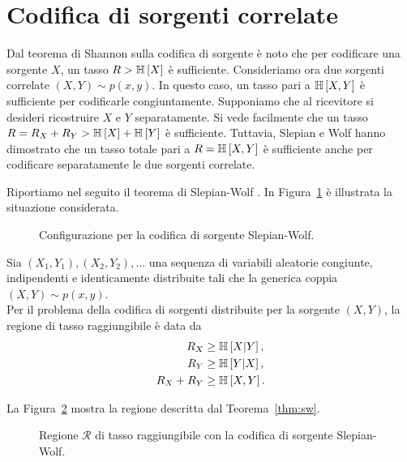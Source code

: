 \section{Codifica di sorgenti correlate}

Dal teorema di Shannon sulla codifica di sorgente
\cite{10.1002/j.1538-7305.1948.tb01338.x} è noto che per codificare una
sorgente \(X\), un tasso \(R > \mathbb{H}\left[ X \right]\) è sufficiente. Consideriamo ora
due sorgenti correlate \((X,Y) \sim p(x, y)\). In questo caso, un tasso pari a
\(\mathbb{H}\left[ X,Y \right]\) è sufficiente per codificarle congiuntamente. Supponiamo che
al ricevitore si desideri ricostruire \(X\) e \(Y\) separatamente. Si vede
facilmente che un tasso \(R = R_X + R_Y > \mathbb{H}\left[ X \right] + \mathbb{H}\left[ Y \right]\) è
sufficiente. Tuttavia, Slepian e Wolf \cite{1055037} hanno dimostrato che un
tasso totale pari a \(R = \mathbb{H}\left[ X,Y \right]\) è sufficiente anche per codificare
separatamente le due sorgenti correlate.

Riportiamo nel seguito il teorema di Slepian-Wolf
\cite{10.1002/047174882X.ch15}. In Figura~\ref{fig:sw-configuration} è
illustrata la situazione considerata.

\begin{figure}[ht]
    \centering
    
    \caption{Configurazione per la codifica di sorgente Slepian-Wolf.}
    \label{fig:sw-configuration}
\end{figure}

\begin{thm}
    \label{thm:sw}

    Sia \((X_1,Y_1),(X_2,Y_2),\dots\) una sequenza di variabili aleatorie
    congiunte, indipendenti e identicamente distribuite tali che la generica
    coppia \((X,Y) \sim p(x, y)\).\\
    Per il problema della codifica di sorgenti distribuite per la sorgente
    \((X,Y)\), la regione di tasso raggiungibile è data da
    \begin{alignat}{1}
        R_X &\ge \mathbb{H}\left[ X \vert Y \right], \label{eq:SW1} \\
        R_Y &\ge \mathbb{H}\left[ Y \vert X \right], \label{eq:SW2} \\
        R_X + R_Y &\ge \mathbb{H}\left[ X,Y \right]. \label{eq:SWsum}
    \end{alignat}
\end{thm}

La Figura~\ref{fig:sw-rate-region} mostra la regione descritta dal
Teorema~\ref{thm:sw}.

\begin{figure}[ht]
    \centering
    
    \caption{Regione \(\mathcal{R}\) di tasso raggiungibile con la codifica di
    sorgente Slepian-Wolf.}
    \label{fig:sw-rate-region}
\end{figure}
